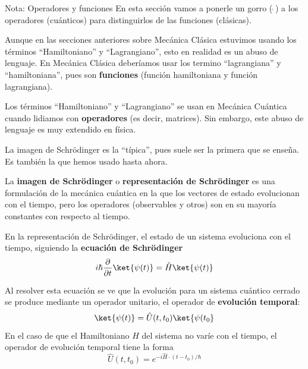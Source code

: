    \begin{mybox_blue}{Nota: Operadores y funciones}
        En esta sección vamos a ponerle un gorro (\,$\hat{}\,$) a los operadores (cuánticos) para distinguirlos de las funciones (clásicas). 
        \vspace{0.3cm}

        Aunque en las secciones anteriores sobre Mecánica Clásica estuvimos usando los términos ``Hamiltoniano'' y ``Lagrangiano'', esto en realidad es un abuso de lenguaje. En Mecánica Clásica deberíamos usar los termino ``lagrangiana'' y ``hamiltoniana'', pues son \textbf{funciones} (función hamiltoniana y función lagrangiana).
        \vspace{0.3cm}

        Los términos ``Hamiltoniano'' y ``Lagrangiano'' se usan en Mecánica Cuántica cuando lidiamos con \textbf{operadores} (es decir, matrices). Sin embargo, este abuso de lenguaje es muy extendido en física. 
    \end{mybox_blue}
        







        La imagen de Schrödinger es la ``típica'', pues suele ser la primera que se enseña. Es también la que hemos usado hasta ahora. 

        La \textbf{imagen de Schrödinger} o \textbf{representación de Schrödinger} es una formulación de la mecánica cuántica en la que los vectores de estado evolucionan con el tiempo, pero los operadores (observables y otros) son en su mayoría constantes con respecto al tiempo. 
        
        En la representación de Schrödinger, el estado de un sistema evoluciona con el tiempo, siguiendo la \textbf{ecuación de Schrödinger}
        \begin{equation}
            i \hbar \frac{\partial}{\partial t} \ket{\psi(t)} = \hat{H} \ket{\psi (t)}
        \end{equation}
        
        Al resolver esta ecuación se ve que la evolución para un sistema cuántico cerrado se produce mediante un operador unitario, el operador de \textbf{evolución temporal}:
        \begin{equation}
            \ket{\psi(t)} = \hat{U}(t, t_0) \ket{\psi (t_0}
        \end{equation}
        En el caso de que el Hamiltoniano $H$ del sistema no varíe con el tiempo, el operador de evolución temporal tiene la forma
        \begin{equation}
            \hat{U} (t, t_0) = e^{-i \hat{H} \cdot (t-t_0)/\hbar}
        \end{equation}
        

